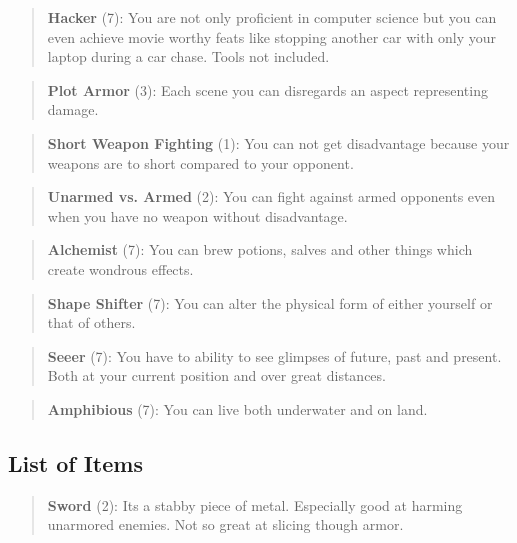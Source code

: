 \documentclass[11pt]{article}
\begin{document}
{\begin{quote}
\textbf{Hacker} (7): You are not only proficient in computer science but you can even achieve movie worthy feats like stopping another car with only your laptop during a car chase. Tools not included.
\end{quote}

\begin{quote}
\textbf{Plot Armor} (3): Each scene you can disregards an aspect representing damage. 
\end{quote}

\begin{quote}
\textbf{Short Weapon Fighting} (1): You can not get disadvantage because your weapons are to short compared to your opponent.
\end{quote}

\begin{quote}
\textbf{Unarmed vs. Armed} (2): You can fight against armed opponents even when you have no weapon without disadvantage.
\end{quote}

\begin{quote}
\textbf{Alchemist} (7): You can brew potions, salves and other things which create wondrous effects.
\end{quote}

\begin{quote}
\textbf{Shape Shifter} (7): You can alter the physical form of either yourself or that of others.
\end{quote}

\begin{quote}
\textbf{Seeer} (7): You have to ability to see glimpses of future, past and present. Both at your current position and over great distances. 
\end{quote}

\begin{quote}
\textbf{Amphibious} (7): You can live both underwater and on land.
\end{quote}


\subsection{List of Items}
\label{sec:org1a307e8}
\begin{quote}
\textbf{Sword} (2): Its a stabby piece of metal. Especially good at harming unarmored enemies. Not so great at slicing though armor. 
\end{quote}

}
\end{document}
